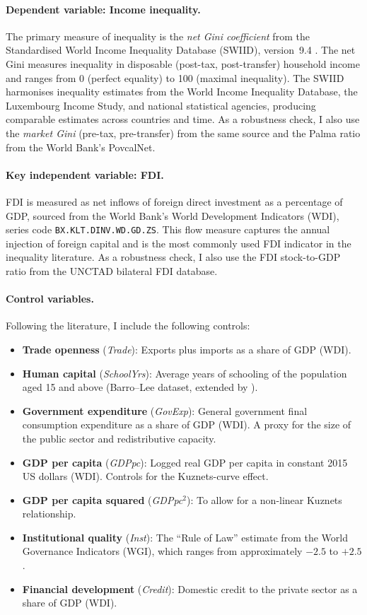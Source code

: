 \documentclass[12pt,a4paper]{article}
\begin{document}
\paragraph{Dependent variable: Income inequality.}
The primary measure of inequality is the \textit{net Gini coefficient} from the Standardised World Income Inequality Database (SWIID), version~9.4 \citep{Solt2020}.  The net Gini measures inequality in disposable (post-tax, post-transfer) household income and ranges from 0 (perfect equality) to 100 (maximal inequality).  The SWIID harmonises inequality estimates from the World Income Inequality Database, the Luxembourg Income Study, and national statistical agencies, producing comparable estimates across countries and time.  As a robustness check, I also use the \textit{market Gini} (pre-tax, pre-transfer) from the same source and the Palma ratio from the World Bank's PovcalNet.

\paragraph{Key independent variable: FDI.}
FDI is measured as net inflows of foreign direct investment as a percentage of GDP, sourced from the World Bank's World Development Indicators (WDI), series code \texttt{BX.KLT.DINV.WD.GD.ZS}.  This flow measure captures the annual injection of foreign capital and is the most commonly used FDI indicator in the inequality literature.  As a robustness check, I also use the FDI stock-to-GDP ratio from the UNCTAD bilateral FDI database.

\paragraph{Control variables.}
Following the literature, I include the following controls:
\begin{itemize}[nosep]
  \item \textbf{Trade openness} (\textit{Trade}): Exports plus imports as a share of GDP (WDI).
  \item \textbf{Human capital} (\textit{SchoolYrs}): Average years of schooling of the population aged 15 and above (Barro--Lee dataset, extended by \citealt{Lee2016}).
  \item \textbf{Government expenditure} (\textit{GovExp}): General government final consumption expenditure as a share of GDP (WDI).  A proxy for the size of the public sector and redistributive capacity.
  \item \textbf{GDP per capita} (\textit{GDPpc}): Logged real GDP per capita in constant 2015 US dollars (WDI).  Controls for the Kuznets-curve effect.
  \item \textbf{GDP per capita squared} (\textit{GDPpc}$^2$): To allow for a non-linear Kuznets relationship.
  \item \textbf{Institutional quality} (\textit{Inst}): The ``Rule of Law'' estimate from the World Governance Indicators (WGI), which ranges from approximately $-2.5$ to $+2.5$ \citep{Kaufmann2011}.
  \item \textbf{Financial development} (\textit{Credit}): Domestic credit to the private sector as a share of GDP (WDI).
\end{itemize}
\end{document}
